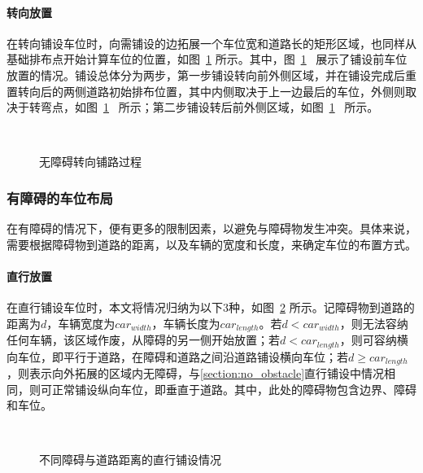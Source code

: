 \paragraph{转向放置}
在转向铺设车位时，向需铺设的边拓展一个车位宽和道路长的矩形区域，也同样从基础排布点开始计算车位的位置，如图~\ref{fig:turn_pave_pro} 所示。其中，图~\ref{fig:turn_pave_pro}~ 展示了铺设前车位放置的情况。铺设总体分为两步，第一步铺设转向前外侧区域，并在铺设完成后重置转向后的两侧道路初始排布位置，其中内侧取决于上一边最后的车位，外侧则取决于转弯点，如图~\ref{fig:turn_pave_pro}~ 所示；第二步铺设转后前外侧区域，如图~\ref{fig:turn_pave_pro}~ 所示。
\begin{figure}[!htb]
    \centering
	\\
    \caption{\label{fig:turn_pave_pro}无障碍转向铺路过程}
\end{figure}

\subsubsection{有障碍的车位布局}
在有障碍的情况下，便有更多的限制因素，以避免与障碍物发生冲突。具体来说，需要根据障碍物到道路的距离，以及车辆的宽度和长度，来确定车位的布置方式。
\paragraph{直行放置}
在直行铺设车位时，本文将情况归纳为以下3种，如图~\ref{fig:stri_obstacle} 所示。记障碍物到道路的距离为$d$，车辆宽度为$car_{width}$，车辆长度为$car_{length}$。若$d<car_{width}$，则无法容纳任何车辆，该区域作废，从障碍的另一侧开始放置；若$d<car_{length}$，则可容纳横向车位，即平行于道路，在障碍和道路之间沿道路铺设横向车位；若$d\geq car_{length}$，则表示向外拓展的区域内无障碍，与\ref{section:no_obstacle}直行铺设中情况相同，则可正常铺设纵向车位，即垂直于道路。其中，此处的障碍物包含边界、障碍和车位。
\begin{figure}[!htb]
    \centering
	\hspace{1cm}
	\\
    \caption{\label{fig:stri_obstacle}不同障碍与道路距离的直行铺设情况}
\end{figure}
